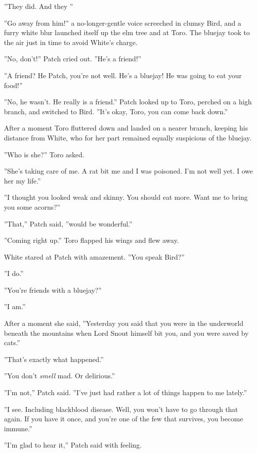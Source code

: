 \documentclass[12pt]{book}
\begin{document}
 ''They did. And they %
''\par
 ''Go away from him!'' a no-longer-gentle voice screeched in clumsy Bird, and a furry white blur launched itself up the elm tree and at Toro. The bluejay took to the air just in time to avoid White's charge.\par
 ''No, don't!'' Patch cried out. ''He's a friend!''\par
 ''A friend? He %
 Patch, you're not well. He's a bluejay! He was going to eat your food!''\par
 ''No, he wasn't. He really is a friend.'' Patch looked up to Toro, perched on a high branch, and switched to Bird. ''It's okay, Toro, you can come back down.''\par
 After a moment Toro fluttered down and landed on a nearer branch, keeping his distance from White, who for her part remained equally suspicious of the bluejay.\par
 ''Who is she?'' Toro asked.\par
 ''She's taking care of me. A rat bit me and I was poisoned. I'm not well yet. I owe her my life.''\par
 ''I thought you looked weak and skinny. You should eat more. Want me to bring you some acorns?''\par
 ''That,'' Patch said, ''would be wonderful.''\par
 ''Coming right up.'' Toro flapped his wings and flew away.\par
 White stared at Patch with amazement. ''You speak Bird?''\par
 ''I do.''\par
 ''You're friends with a bluejay?''\par
 ''I am.''\par
 After a moment she said, ''Yesterday you said that you were in the underworld beneath the mountains when Lord Snout himself bit you, and you were saved by cats.''\par
 ''That's exactly what happened.''\par
 ''You don't {\it smell} mad. Or delirious.''\par
 ''I'm not,'' Patch said. ''I've just had rather a lot of things happen to me lately.''\par
 ''I see. Including blackblood disease. Well, you won't have to go through that again. If you have it once, and you're one of the few that survives, you become immune.''\par
 ''I'm glad to hear it,'' Patch said with feeling.\par
\end{document}
